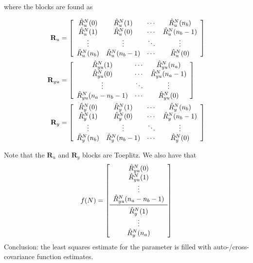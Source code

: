 where the blocks are found as

\begin{align*}
\mathbf{R}_u &= \left[\begin{array}{c c c c}
\hat{R}_u^N(0) & \hat{R}_u^N(1) & \cdots & \hat{R}_u^N(n_b) \\
\hat{R}_u^N(1) & \hat{R}_u^N(0) & \cdots & \hat{R}_u^N(n_b-1) \\
\vdots & \vdots & \ddots & \vdots \\
\hat{R}_u^N(n_b) & \hat{R}_u^N(n_b-1) & \cdots & \hat{R}_u^N(0)
\end{array}\right] \\
\mathbf{R}_{yu} &= \left[\begin{array}{c c c}
\hat{R}_{yu}^N(1) & \cdots & \hat{R}_{yu}^N(n_a) \\
\hat{R}_{yu}^N(0) & \cdots & \hat{R}_{yu}^N(n_a-1) \\
\vdots & \ddots & \vdots \\
\hat{R}_{yu}^N(n_a-n_b-1) & \cdots & \hat{R}_{yu}^N(0)
\end{array}\right] \\
\mathbf{R}_y &= \left[\begin{array}{c c c c}
\hat{R}_y^N(0) & \hat{R}_y^N(1) & \cdots & \hat{R}_y^N(n_b) \\
\hat{R}_y^N(1) & \hat{R}_y^N(0) & \cdots & \hat{R}_y^N(n_b-1) \\
\vdots & \vdots & \ddots & \vdots \\
\hat{R}_y^N(n_b) & \hat{R}_y^N(n_b-1) & \cdots & \hat{R}_y^N(0)
\end{array}\right]
\end{align*}

Note that the $\mathbf{R}_u$ and $\mathbf{R}_y$ blocks are Toeplitz.
We also have that
\begin{align*}
f(N) = \left[\begin{array}{c}
\hat{R}_{yu}^N(0) \\
\hat{R}_{yu}^N(1) \\
\vdots \\
\hat{R}_{yu}^N(n_a-n_b-1) \\
\midrule
\hat{R}_y^N(1) \\
\vdots \\
\hat{R}_y^N(n_a) \end{array}\right]
\end{align*}
Conclusion: the least squares estimate for the parameter is filled with auto-/cross-covariance function estimates.

